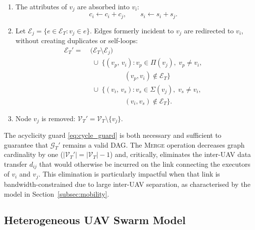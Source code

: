 \begin{enumerate}[label=(\roman*), leftmargin=*, itemsep=2pt]
  \item The attributes of $v_j$ are absorbed into $v_i$:
        \begin{equation}
          c_i \leftarrow c_i + c_j, \qquad
          s_i \leftarrow s_i + s_j.
          \label{eq:merge_attr}
        \end{equation}

  \item Let $\mathcal{E}_j = \{e \in \mathcal{E}_T : v_j \in e\}$.
        Edges formerly incident to $v_j$ are redirected to $v_i$,
        without creating duplicates or self-loops:
        \begin{align}
          \mathcal{E}_T' =\;& \bigl(\mathcal{E}_T \setminus \mathcal{E}_j\bigr)
          \nonumber\\
          &\;\cup\; \bigl\{(v_p,\, v_i) :
            v_p \in \Pi(v_j),\; v_p \neq v_i,
          \nonumber\\
          &\qquad\qquad\quad (v_p, v_i) \notin \mathcal{E}_T\bigr\}
          \nonumber\\
          &\;\cup\; \bigl\{(v_i,\, v_s) :
            v_s \in \Sigma(v_j),\; v_s \neq v_i,
          \nonumber\\
          &\qquad\qquad\quad (v_i, v_s) \notin \mathcal{E}_T\bigr\}.
          \label{eq:merge_edges}
        \end{align}

  \item Node $v_j$ is removed:
        $\mathcal{V}_T' = \mathcal{V}_T \setminus \{v_j\}$.
\end{enumerate}

The acyclicity guard \eqref{eq:cycle_guard} is both necessary and
sufficient to guarantee that $\mathcal{G}_T'$ remains a valid DAG.
The \textsc{Merge} operation decreases graph cardinality by one
($|\mathcal{V}_T'| = |\mathcal{V}_T| - 1$) and, critically, eliminates
the inter-UAV data transfer $d_{ij}$ that would otherwise be incurred
on the link connecting the executors of $v_i$ and $v_j$.
This elimination is particularly impactful when that link is
bandwidth-constrained due to large inter-UAV separation, as
characterised by the model in Section~\ref{subsec:mobility}.

\subsection{Heterogeneous UAV Swarm Model}
\label{subsec:uav_model}

